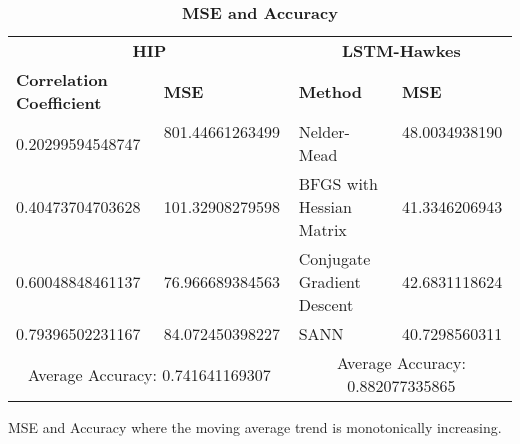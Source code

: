 \documentclass[10pt,letterpaper]{article}
\newlength\savedwidth
\newcommand\thickhline{\noalign{\global\savedwidth\arrayrulewidth\global\arrayrulewidth 2pt}%
\hline
\noalign{\global\arrayrulewidth\savedwidth}}
\begin{document}
\begin{table}[H]
\begin{adjustwidth}{-2.25in}{0in} %
\caption{{\bf MSE and Accuracy}}
\begin{tabular}{|l|l|l|l|} 
\hline
\multicolumn{2}{|c|}{\bf HIP} & 
\multicolumn{2}{c|}{\bf LSTM-Hawkes}\\ \thickhline

\textbf{Correlation Coefficient} & 
\textbf{MSE} & 
\textbf{Method} & 
\textbf{MSE}\\ \hline

0.20299594548747 
\quad \quad \quad \quad \quad & 
801.44661263499 \quad \quad \quad \ \ & 
Nelder-Mead &
48.0034938190 \quad \quad \quad \ \\ \hline

0.40473704703628 &
101.32908279598 &
BFGS with Hessian Matrix &
41.3346206943\\ \hline

0.60048848461137 & 
76.966689384563 & 
Conjugate Gradient Descent
\quad \quad \quad \quad \quad & 
42.6831118624\\ \hline

0.79396502231167 & 
84.072450398227 & 
SANN & 
40.7298560311\\ \hline

\multicolumn{2}{|c|}{Average Accuracy: 0.741641169307} & 
\multicolumn{2}{c|}{Average Accuracy: 0.882077335865}\\ \hline
\end{tabular}

\begin{flushleft} MSE and Accuracy where the moving average trend is monotonically increasing.
\end{flushleft}
\label{table3}
\end{adjustwidth}
\end{table}
\end{document}
